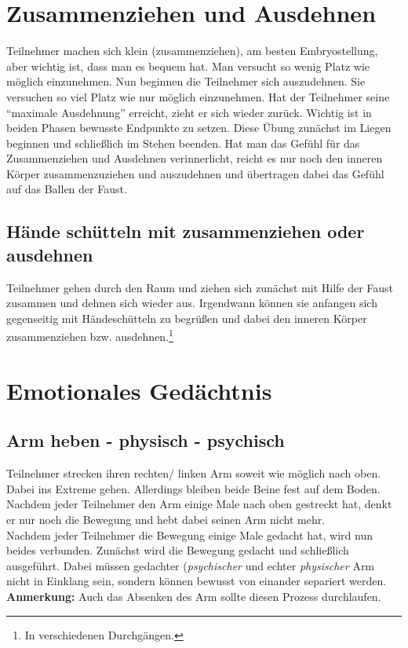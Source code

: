 \documentclass[ngerman, a4paper, twoside]{scrbook}%
\begin{document}
	\section{Zusammenziehen und Ausdehnen} \label{sec:Zusammenziehen und Ausdehnen}
	Teilnehmer machen sich klein (zusammenziehen), am besten Embryostellung, aber wichtig ist, dass man es bequem hat. Man versucht so wenig Platz wie möglich einzunehmen. Nun beginnen die Teilnehmer sich auszudehnen. Sie versuchen so viel Platz wie nur möglich einzunehmen. Hat der Teilnehmer seine "`maximale Ausdehnung"' erreicht, zieht er sich wieder zurück. Wichtig ist in beiden Phasen bewusste Endpunkte zu setzen. Diese Übung zunächst im Liegen beginnen und schließlich im Stehen beenden. Hat man das Gefühl für das Zusammenziehen und Ausdehnen verinnerlicht, reicht es nur noch den inneren Körper zusammenzuziehen und auszudehnen und übertragen dabei das Gefühl auf das Ballen der Faust.
	\subsection{Hände schütteln mit zusammenziehen oder ausdehnen}
	Teilnehmer gehen durch den Raum und ziehen sich zunächst mit Hilfe der Faust zusammen und dehnen sich wieder aus. Irgendwann können sie anfangen sich gegenseitig mit Händeschütteln zu begrüßen und dabei den inneren Körper zusammenziehen bzw. ausdehnen.\footnote{In verschiedenen Durchgängen.}
	\section{Emotionales Gedächtnis}
	\subsection{Arm heben - physisch - psychisch}
	Teilnehmer strecken ihren rechten/ linken Arm soweit wie möglich nach oben. Dabei ins Extreme gehen. Allerdings bleiben beide Beine fest auf dem Boden.\\
	Nachdem jeder Teilnehmer den Arm einige Male nach oben gestreckt hat, denkt er nur noch die Bewegung und hebt dabei seinen Arm nicht mehr.\\
	Nachdem jeder Teilnehmer die Bewegung einige Male gedacht hat, wird nun beides verbunden. Zunächst wird die Bewegung gedacht und schließlich ausgeführt. Dabei müssen gedachter (\emph{psychischer} und echter \emph{physischer} Arm nicht in Einklang sein, sondern können bewusst von einander separiert werden. \\
	\textbf{Anmerkung:} Auch das Absenken des Arm sollte diesen Prozess durchlaufen.
\end{document}
